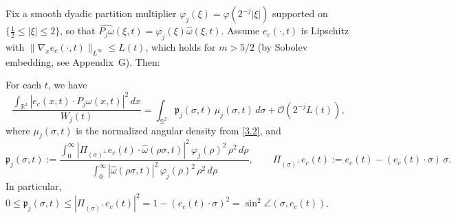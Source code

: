 \documentclass[11pt]{article}
\begin{document}
Fix a smooth dyadic partition multiplier $\varphi_j(\xi) = \varphi(2^{-j} |\xi|)$ supported on $\{\frac{1}{2} \leq |\xi| \leq 2\}$, so that $\widehat{P_j \omega}(\xi,t) = \varphi_j(\xi) \widehat{\omega}(\xi,t)$. Assume $e_c(\cdot, t)$ is Lipschitz with $\|\nabla_x e_c(\cdot, t)\|_{L^\infty} \leq L(t)$, which holds for $m > 5/2$ (by Sobolev embedding, see Appendix~G). Then:

\begin{lemma} \label{lem:bridge}
For each $t$, we have
\begin{equation}
\frac{\int_{\mathbb{R}^3} |e_c(x,t) \cdot P_j \omega(x,t)|^2 \, dx}{W_j(t)}
= \int_{\mathbb{S}^2} \mathfrak{p}_j(\sigma, t) \, \mu_j(\sigma,t) \, d\sigma + \mathcal{O}\!\left( 2^{-j} L(t) \right), \tag{4.2}
\end{equation}
where $\mu_j(\sigma,t)$ is the normalized angular density from \eqref{3.2}, and
\begin{equation}
\mathfrak{p}_j(\sigma, t) := \frac{ \int_0^\infty \left| \Pi_{(\sigma)^\perp} e_c(t) \cdot \widehat{\omega}(\rho \sigma, t) \right|^2 \, \varphi_j(\rho)^2 \, \rho^2 \, d\rho }{ \int_0^\infty \left| \widehat{\omega}(\rho \sigma, t)\right|^2 \, \varphi_j(\rho)^2 \, \rho^2 \, d\rho }, \qquad \Pi_{(\sigma)^\perp} e_c(t) := e_c(t) - (e_c(t)\cdot \sigma)\, \sigma. \tag{4.3}
\end{equation}
In particular, $0 \leq \mathfrak{p}_j(\sigma,t) \leq |\Pi_{(\sigma)^\perp} e_c(t)|^2 = 1 - (e_c(t) \cdot \sigma)^2 = \sin^2 \angle(\sigma, e_c(t))$.
\end{lemma}
\end{document}
